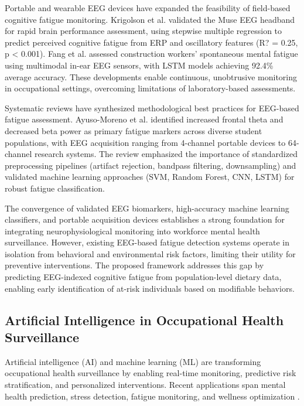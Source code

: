 \documentclass[journal,twoside,10pt]{IEEEtran}
\begin{document}
Portable and wearable EEG devices have expanded the feasibility of field-based cognitive fatigue monitoring. Krigolson et al. \cite{ref23} validated the Muse EEG headband for rapid brain performance assessment, using stepwise multiple regression to predict perceived cognitive fatigue from ERP and oscillatory features (R? = 0.25, p < 0.001). Fang et al. \cite{ref25} assessed construction workers' spontaneous mental fatigue using multimodal in-ear EEG sensors, with LSTM models achieving 92.4\% average accuracy. These developments enable continuous, unobtrusive monitoring in occupational settings, overcoming limitations of laboratory-based assessments.

Systematic reviews have synthesized methodological best practices for EEG-based fatigue assessment. Ayuso-Moreno et al. \cite{ref18} identified increased frontal theta and decreased beta power as primary fatigue markers across diverse student populations, with EEG acquisition ranging from 4-channel portable devices to 64-channel research systems. The review emphasized the importance of standardized preprocessing pipelines (artifact rejection, bandpass filtering, downsampling) and validated machine learning approaches (SVM, Random Forest, CNN, LSTM) for robust fatigue classification.

The convergence of validated EEG biomarkers, high-accuracy machine learning classifiers, and portable acquisition devices establishes a strong foundation for integrating neurophysiological monitoring into workforce mental health surveillance. However, existing EEG-based fatigue detection systems operate in isolation from behavioral and environmental risk factors, limiting their utility for preventive interventions. The proposed framework addresses this gap by predicting EEG-indexed cognitive fatigue from population-level dietary data, enabling early identification of at-risk individuals based on modifiable behaviors.

\subsection{Artificial Intelligence in Occupational Health Surveillance}

Artificial intelligence (AI) and machine learning (ML) are transforming occupational health surveillance by enabling real-time monitoring, predictive risk stratification, and personalized interventions. Recent applications span mental health prediction, stress detection, fatigue monitoring, and wellness optimization \cite{ref7,ref15,ref16,ref18,ref21,ref23,ref24,ref25,ref29,ref30}.
\end{document}
